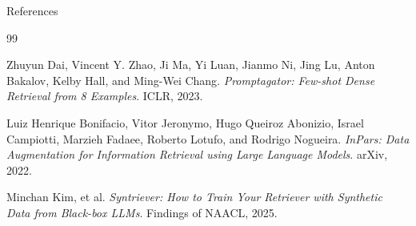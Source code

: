 \documentclass{beamer}
\begin{document}
\begin{frame}[allowframebreaks]{References}
\footnotesize
\begin{thebibliography}{99}

Zhuyun Dai, Vincent Y. Zhao, Ji Ma, Yi Luan, Jianmo Ni, Jing Lu, Anton Bakalov, Kelby Hall, and Ming-Wei Chang.
\newblock \textit{Promptagator: Few-shot Dense Retrieval from 8 Examples}.
\newblock ICLR, 2023.

Luiz Henrique Bonifacio, Vitor Jeronymo, Hugo Queiroz Abonizio, Israel Campiotti, Marzieh Fadaee, Roberto Lotufo, and Rodrigo Nogueira.
\newblock \textit{InPars: Data Augmentation for Information Retrieval using Large Language Models}.
\newblock arXiv, 2022.

Minchan Kim, et al.
\newblock \textit{Syntriever: How to Train Your Retriever with Synthetic Data from Black-box LLMs}.
\newblock Findings of NAACL, 2025.

\end{thebibliography}
\end{frame}
\end{document}
